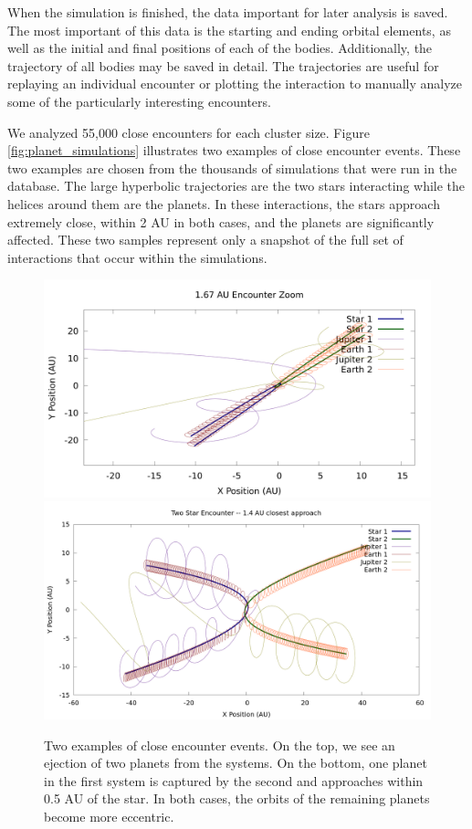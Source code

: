 \documentclass[12pt]{article}
\begin{document}
    When the simulation is finished, the data important for later analysis is
    saved. The most important of this data is the starting and ending
    orbital elements, as well as the initial and final positions of each of the bodies.
    Additionally, the trajectory of all bodies may be saved in detail. 
    The trajectories are useful for replaying an individual encounter or plotting the
    interaction to manually analyze some of the particularly interesting 
    encounters.

    We analyzed 55,000 close encounters for each cluster size. 
    Figure \ref{fig:planet_simulations} illustrates two examples of close encounter
    events. These two examples are chosen from the thousands of simulations
    that were run in the database. The large hyperbolic trajectories are the 
    two stars interacting while the helices around them are the planets. In these
    interactions, the stars approach extremely close, within 2 AU in both cases, and
    the planets are significantly affected. These two samples represent only
    a snapshot of the full set of interactions that occur within the simulations.

    \begin{figure}[H]
        \centering
        \caption{Two examples of close encounter events. On the top, we see
            an ejection of two planets from the systems. On the bottom, one planet
            in the first system is captured by the second and approaches 
            within 0.5 AU of the star. In both cases, the
            orbits of the remaining planets become more eccentric.
        }
        \includegraphics[width=5in]{1_67_AU_zoom}
        \includegraphics[width=5in]{1.4AU/1_4_AU_encounter_plot}
    \end{figure}
\end{document}

